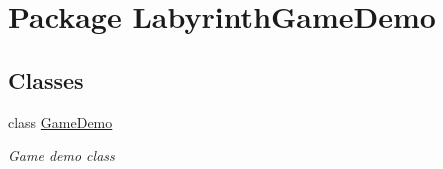 \hypertarget{namespace_labyrinth_game_demo}{\section{Package Labyrinth\+Game\+Demo}
\label{namespace_labyrinth_game_demo}
}
\subsection*{Classes}
\begin{DoxyCompactItemize}
\item 
class \hyperlink{class_labyrinth_game_demo_1_1_game_demo}{Game\+Demo}
\begin{DoxyCompactList}\small\item\em Game demo class \end{DoxyCompactList}\end{DoxyCompactItemize}
